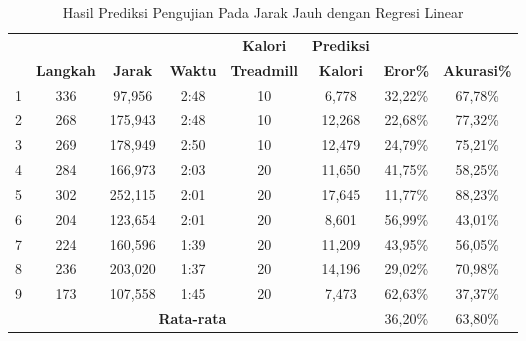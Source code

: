 \begin{longtable}{|c|c|c|c|c|c|c|c|}
  \caption{Hasil Prediksi Pengujian Pada Jarak Jauh dengan Regresi Linear}
  \label{tb:PengujianJarakJauhAnalisaPrediksiRegresi}                                   \\
  \hline
  \rowcolor[HTML]{C0C0C0}
  & & & & \textbf{Kalori} & \textbf{Prediksi} & & \\
  \rowcolor[HTML]{C0C0C0}
  \multirow{-2}{*}{\textbf{Percobaan}} & \multirow{-2}{*}{\textbf{Langkah}} & \multirow{-2}{*}{\textbf{Jarak}} & \multirow{-2}{*}{\textbf{Waktu}} & \textbf{Treadmill} & \textbf{Kalori} & \multirow{-2}{*}{\textbf{Eror\%}} & \multirow{-2}{*}{\textbf{Akurasi\%}} \\
  
  \hline
  1   & 336   & 97,956     & 2:48    & 10    & 6,778    & 32,22\%      & 67,78\%   \\
  \hline  
  2   & 268   & 175,943    & 2:48    & 10    & 12,268   & 22,68\%      & 77,32\%  \\
  \hline
  3   & 269   & 178,949    & 2:50    & 10    & 12,479   & 24,79\%      & 75,21\%   \\
  \hline
  4   & 284   & 166,973    & 2:03    & 20    & 11,650   & 41,75\%      & 58,25\%  \\
  \hline
  5   & 302   & 252,115    & 2:01    & 20    & 17,645   & 11,77\%      & 88,23\%    \\
  \hline
  6   & 204   & 123,654    & 2:01    & 20    & 8,601    & 56,99\%      & 43,01\%   \\
  \hline
  7   & 224   & 160,596    & 1:39    & 20    & 11,209   & 43,95\%      & 56,05\%   \\
  \hline
  8   & 236   & 203,020    & 1:37    & 20    & 14,196   & 29,02\%      & 70,98\%   \\
  \hline
  9   & 173   & 107,558    & 1:45    & 20    & 7,473    & 62,63\%      & 37,37\%   \\
  \hline

  \multicolumn{6}{|c|}{\textbf{Rata-rata}} & 36,20\% & 63,80\% \\
  \hline
\end{longtable}

